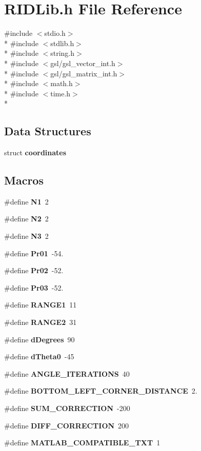 \section{R\+I\+D\+Lib.\+h File Reference}
\label{RIDLib_8h}
{\ttfamily \#include $<$stdio.\+h$>$}\\*
{\ttfamily \#include $<$stdlib.\+h$>$}\\*
{\ttfamily \#include $<$string.\+h$>$}\\*
{\ttfamily \#include $<$gsl/gsl\+\_\+vector\+\_\+int.\+h$>$}\\*
{\ttfamily \#include $<$gsl/gsl\+\_\+matrix\+\_\+int.\+h$>$}\\*
{\ttfamily \#include $<$math.\+h$>$}\\*
{\ttfamily \#include $<$time.\+h$>$}\\*
\subsection*{Data Structures}
\begin{DoxyCompactItemize}
\item 
struct {\bf coordinates}
\end{DoxyCompactItemize}
\subsection*{Macros}
\begin{DoxyCompactItemize}
\item 
\#define {\bf N1}~2
\item 
\#define {\bf N2}~2
\item 
\#define {\bf N3}~2
\item 
\#define {\bf Pr01}~-\/54.
\item 
\#define {\bf Pr02}~-\/52.
\item 
\#define {\bf Pr03}~-\/52.
\item 
\#define {\bf R\+A\+N\+G\+E1}~11
\item 
\#define {\bf R\+A\+N\+G\+E2}~31
\item 
\#define {\bf d\+Degrees}~90
\item 
\#define {\bf d\+Theta0}~-\/45
\item 
\#define {\bf A\+N\+G\+L\+E\+\_\+\+I\+T\+E\+R\+A\+T\+I\+O\+NS}~40
\item 
\#define {\bf B\+O\+T\+T\+O\+M\+\_\+\+L\+E\+F\+T\+\_\+\+C\+O\+R\+N\+E\+R\+\_\+\+D\+I\+S\+T\+A\+N\+CE}~2.
\item 
\#define {\bf S\+U\+M\+\_\+\+C\+O\+R\+R\+E\+C\+T\+I\+ON}~-\/200
\item 
\#define {\bf D\+I\+F\+F\+\_\+\+C\+O\+R\+R\+E\+C\+T\+I\+ON}~200
\item 
\#define {\bf M\+A\+T\+L\+A\+B\+\_\+\+C\+O\+M\+P\+A\+T\+I\+B\+L\+E\+\_\+\+T\+XT}~1
\end{DoxyCompactItemize}
